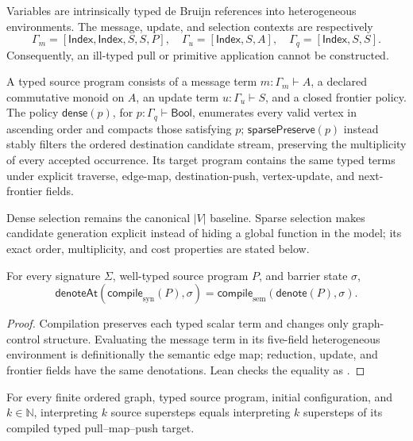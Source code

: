 Variables are intrinsically typed de Bruijn references into heterogeneous
environments.  The message, update, and selection contexts are respectively
\[
 \Gamma_m=[\mathsf{Index},\mathsf{Index},S,S,P],\quad
 \Gamma_u=[\mathsf{Index},S,A],\quad
 \Gamma_q=[\mathsf{Index},S,S].
\]
Consequently, an ill-typed pull or primitive application cannot be
constructed.

\begin{definition}
A typed source program consists of a message term
$m:\Gamma_m\vdash A$, a declared commutative monoid on $A$, an update term
$u:\Gamma_u\vdash S$, and a closed frontier policy.  The policy
$\mathsf{dense}(p)$, for $p:\Gamma_q\vdash\mathsf{Bool}$, enumerates every
valid vertex in ascending order and compacts those satisfying $p$;
$\mathsf{sparsePreserve}(p)$ instead stably filters the ordered destination
candidate stream, preserving the multiplicity of every accepted occurrence.
Its target program contains the same typed terms under explicit traverse,
edge-map,
destination-push, vertex-update, and next-frontier fields.
\end{definition}

Dense selection remains the canonical $|V|$ baseline.  Sparse selection makes
candidate generation explicit instead of hiding a global function in the
model; its exact order, multiplicity, and cost properties are stated below.

\begin{theorem}
\label{thm:typed-denotation}
For every signature $\Sigma$, well-typed source program $P$, and barrier state
$\sigma$,
\[
 \mathsf{denoteAt}(\mathsf{compile}_{\mathrm{syn}}(P),\sigma)
 =\mathsf{compile}_{\mathrm{sem}}(\mathsf{denote}(P),\sigma).
\]
\end{theorem}

\begin{proof}
Compilation preserves each typed scalar term and changes only graph-control
structure.  Evaluating the message term in its five-field heterogeneous
environment is definitionally the semantic edge map; reduction, update, and
frontier fields have the same denotations.  Lean checks the equality as
.
\end{proof}

\begin{corollary}
\label{cor:typed-run}
For every finite ordered graph, typed source program, initial configuration,
and $k\in\mathbb{N}$, interpreting $k$ source supersteps equals interpreting
$k$ supersteps of its compiled typed pull--map--push target.
\end{corollary}

